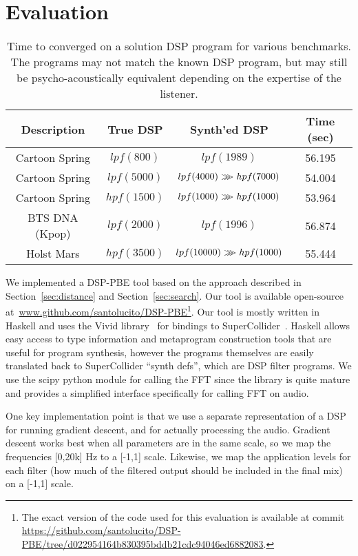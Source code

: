\section{Evaluation}
\label{sec:eval}
\begin{table*}[!ht]
\centering
\setlength\tabcolsep{2em}
\begin{tabular}{|c | c | c | c |} 
 \hline
 Description & True DSP & Synth'ed DSP & Time (sec) \\ 
 \hline\hline
 Cartoon Spring & $lpf(800)  $ & $lpf(1989) $ & 56.195 \\
 Cartoon Spring & $lpf(5000) $ & $lpf(4000) >\mkern-9mu>\mkern-9mu> hpf(7000) $ & 54.004 \\
 Cartoon Spring & $hpf(1500) $ & $lpf(1000) >\mkern-9mu>\mkern-9mu> hpf(1000) $ & 53.964 \\
 BTS DNA (Kpop) & $lpf(2000) $ & $lpf(1996)	 $ & 56.874 \\
 Holst Mars     & $hpf(3500) $ & $lpf(10000) >\mkern-9mu>\mkern-9mu> hpf(1000)$  & 55.444 \\
 \hline
\end{tabular}
\caption{Time to converged on a solution DSP program for various benchmarks. The programs may not match the known DSP program, but may still be psycho-acoustically equivalent depending on the expertise of the listener. }
\label{table:eval}
\end{table*}

We implemented a DSP-PBE tool based on the approach described in Section~\ref{sec:distance} and Section~\ref{sec:search}.
Our tool is available open-source at~\url{www.github.com/santolucito/DSP-PBE}\footnote{The exact version of the code used for this evaluation is available at commit \url{https://github.com/santolucito/DSP-PBE/tree/d022954164b830395bddb21cdc94046ed6882083}.}.
Our tool is mostly written in Haskell and uses the Vivid library~\cite{vivid} for bindings to SuperCollider~\cite{supercollider}.
Haskell allows easy access to type information and metaprogram construction tools that are useful for program synthesis, however the programs themselves are easily translated back to SuperCollider ``synth defs'', which are DSP filter programs.
We use the scipy python module for calling the FFT since the library is quite mature and provides a simplified interface specifically for calling FFT on audio.

One key implementation point is that we use a separate representation of a DSP for running gradient descent, and for actually processing the audio.
Gradient descent works best when all parameters are in the same scale, so we map the frequencies [0,20k] Hz to a [-1,1] scale.
Likewise, we map the application levels for each filter (how much of the filtered output should be included in the final mix) on a [-1,1] scale.

